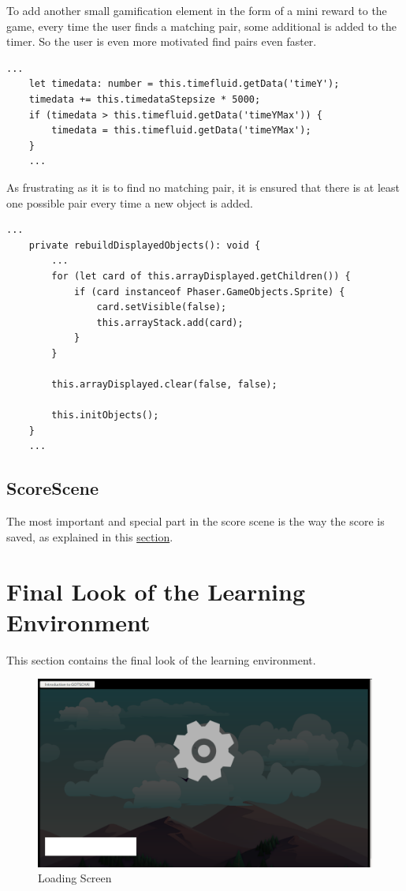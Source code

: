 To add another small gamification element in the form of a mini reward to the game, every time the user finds a matching
pair, some additional is added to the timer. So the user is even more motivated find pairs even faster.

\begin{lstlisting}[style=TypeScript, caption={updateProgressbar (gameScene.ts)}]
    ...
    let timedata: number = this.timefluid.getData('timeY');
    timedata += this.timedataStepsize * 5000;
    if (timedata > this.timefluid.getData('timeYMax')) {
        timedata = this.timefluid.getData('timeYMax');
    }
    ...
\end{lstlisting}

As frustrating as it is to find no matching pair,
it is ensured that there is at least one possible pair every time a new object is added.

\begin{lstlisting}[style=TypeScript, caption={INSERT (gameScene.ts)}]
    ...
    private rebuildDisplayedObjects(): void {
        ...
        for (let card of this.arrayDisplayed.getChildren()) {
            if (card instanceof Phaser.GameObjects.Sprite) {
                card.setVisible(false);
                this.arrayStack.add(card);
            }
        }

        this.arrayDisplayed.clear(false, false);

        this.initObjects();
    }
    ...
\end{lstlisting}

\subsection{ScoreScene}\label{subsec:scorescene}
The most important and special part in the score scene is the way the score is saved,
as explained in this \hyperref[ref:scorestorage]{section}.

\section{Final Look of the Learning Environment}\label{sec:final-look-of-the-learning-environment}
This section contains the final look of the learning environment.

\begin{figure}[H]
    \centering
    \includegraphics[width=1\textwidth]{figures/loadingscreen}
    \caption{Loading Screen}
    \label{fig:loadingscreen}
\end{figure}

